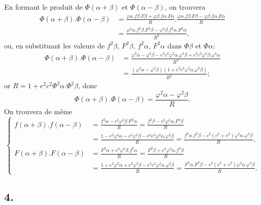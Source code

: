 \documentclass{article}
\begin{document}
En formant le produit de $\Phi(\alpha+\beta)$ et $\Phi(\alpha-\beta)$, on trouvera
\[ \begin{aligned} \Phi(\alpha+\beta).\Phi(\alpha-\beta)&=\frac{\varphi\alpha.f\beta.F\beta+\varphi\beta.f\alpha.F\alpha}{R}.\frac{\varphi\alpha.f\beta.F\beta-\varphi\beta.f\alpha.F\alpha}{R}\\ &=\frac{\varphi^{2}\alpha.f^{2}\beta.F^{2}\beta-\varphi^{2}\beta.f^{2}\alpha.F^{2}\alpha}{R^{2}}, \end{aligned} \]
ou, en substituant les valeurs de $f^{2}\beta$, $F^{2}\beta$, $f^{2}\alpha$, $F^{2}\alpha$ dans $\Phi\beta$ et $\Phi\alpha$:
\[ \begin{aligned} \Phi(\alpha+\beta).\Phi(\alpha-\beta)&=\frac{\varphi^{2}\alpha-\varphi^{2}\beta-e^{2}c^{2}\varphi^{2}\alpha.\varphi^{4}\beta+e^{2}c^{2}\varphi^{2}\beta.\varphi^{4}\alpha}{R^{2}}\\ &=\frac{(\varphi^{2}\alpha-\varphi^{2}\beta)(1+e^{2}c^{2}\varphi^{2}\alpha.\varphi^{2}\beta)}{R^{2}}; \end{aligned} \]
or $R=1+e^{2}c^{2}\Phi^{2}\alpha.\Phi^{2}\beta$, donc
\[ \Phi(\alpha+\beta).\Phi(\alpha-\beta)=\frac{\varphi^{2}\alpha-\varphi^{2}\beta}{R}. \tag{13.} \]
On trouvera de même
\[ \left\{\begin{aligned} f(\alpha+\beta).f(\alpha-\beta)&=\frac{f^{2}\alpha-c^{2}\varphi^{2}\beta.F^{2}\alpha}{R}=\frac{f^{2}\beta-c^{2}\varphi^{2}\alpha.F^{2}\beta}{R}\\ &=\frac{1-c^{2}\varphi^{2}\alpha-c^{2}\varphi^{2}\beta-c^{2}e^{2}\varphi^{2}\alpha.\varphi^{2}\beta}{R}=\frac{f^{2}\alpha.f^{2}\beta-c^{2}(c^{2}+e^{2})\varphi^{2}\alpha.\varphi^{2}\beta}{R},\\ F(\alpha+\beta).F(\alpha-\beta)&=\frac{F^{2}\alpha+e^{2}\varphi^{2}\beta.f^{2}\alpha}{R}=\frac{F^{2}\beta+e^{2}\varphi^{2}\alpha.f^{2}\beta}{R}\\ &=\frac{1+e^{2}\varphi^{2}\alpha+e^{2}\varphi^{2}\beta-e^{2}c^{2}\varphi^{2}\alpha.\varphi^{2}\beta}{R}=\frac{F^{2}\alpha.F^{2}\beta-e^{2}(c^{2}+e^{2})\varphi^{2}\alpha.\varphi^{2}\beta}{R}. \end{aligned}\right. \tag{14.} \]


\subsection*{4.}
\end{document}
